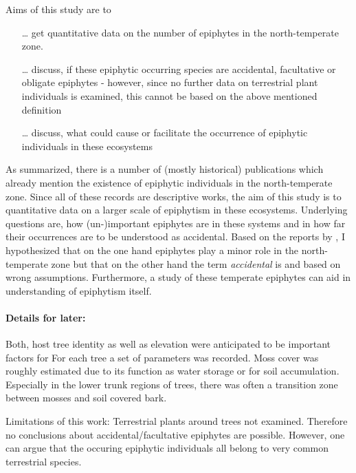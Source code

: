 \documentclass[12pt, a4paper, oneside, draft]{article}
\begin{document}
Aims of this study are to
\begin{itemize}
	\item[…] get quantitative data on the number of epiphytes in the north-temperate zone.
	\item[…] discuss, if these epiphytic occurring species are accidental, facultative or obligate epiphytes
	\subitem - however, since no further data on terrestrial plant individuals is examined, this cannot be based on the above mentioned definition
	\item[…] discuss, what could cause or facilitate the occurrence of epiphytic individuals in these ecosystems 
\end{itemize}

As \textcite{Zotz2003} summarized, there is a number of (mostly historical) publications which already mention the existence of epiphytic individuals in the north-temperate zone. Since all of these records are descriptive works, the aim of this study is to  quantitative data on a larger scale of epiphytism in these ecosystems. Underlying questions are, how (un-)important epiphytes are in these systems and in how far their occurrences are to be understood as accidental. Based on the reports by , I hypothesized that on the one hand epiphytes play a minor role in the north-temperate zone but that on the other hand the term \textit{accidental} is  and based on wrong assumptions. Furthermore, a study of these temperate epiphytes can aid in understanding of epiphytism itself.



\paragraph{Details for later:}
Both, host tree identity as well as elevation were anticipated to be important factors for%
For each tree a set of parameters was recorded. Moss cover was roughly estimated due to its function as water storage or for soil accumulation. 
Especially in the lower trunk regions of trees, there was often a transition zone between mosses and soil covered bark. 


Limitations of this work: Terrestrial plants around trees not examined. Therefore no conclusions  about accidental/facultative epiphytes are possible. However, one can argue that the occuring epiphytic individuals all belong to very common terrestrial species.

\end{document}
